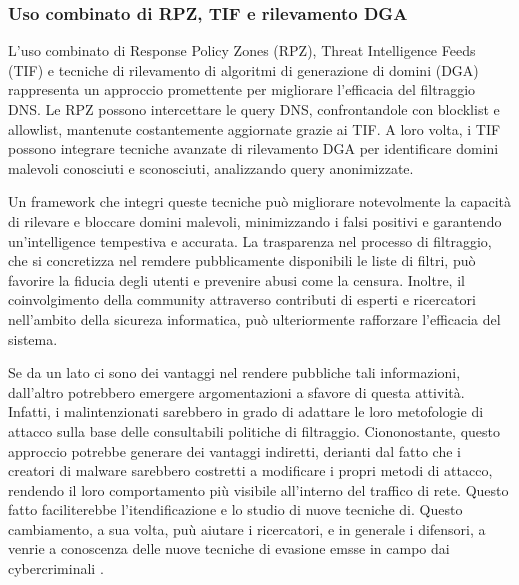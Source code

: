 \subsubsection{Uso combinato di RPZ, TIF e rilevamento DGA}
L'uso combinato di Response Policy Zones (RPZ), Threat Intelligence Feeds (TIF) e tecniche di rilevamento di algoritmi di generazione di domini (DGA) rappresenta un approccio promettente per migliorare l'efficacia del filtraggio DNS. Le RPZ possono intercettare le query DNS, confrontandole con blocklist e allowlist, mantenute costantemente aggiornate grazie ai TIF. A loro volta, i TIF possono integrare tecniche avanzate di rilevamento DGA per identificare domini malevoli conosciuti e sconosciuti, analizzando query anonimizzate.

Un framework che integri queste tecniche può migliorare notevolmente la capacità di rilevare e bloccare domini malevoli, minimizzando i falsi positivi e garantendo un'intelligence tempestiva e accurata. La trasparenza nel processo di filtraggio, che si concretizza nel remdere pubblicamente disponibili le liste di filtri, può favorire la fiducia degli utenti e prevenire abusi come la censura. Inoltre, il coinvolgimento della community attraverso contributi di esperti e ricercatori nell'ambito della sicureza informatica, può ulteriormente rafforzare l'efficacia del sistema.

Se da un lato ci sono dei vantaggi nel rendere pubbliche tali informazioni, dall'altro potrebbero emergere argomentazioni a sfavore di questa attività. Infatti, i malintenzionati sarebbero in grado di adattare le loro metofologie di attacco sulla base delle consultabili politiche di filtraggio. Ciononostante, questo approccio potrebbe generare dei vantaggi indiretti, derianti dal fatto che i creatori di malware sarebbero costretti a modificare i propri metodi di attacco, rendendo il loro comportamento più visibile all'interno del traffico di rete. Questo fatto faciliterebbe l'itendificazione e lo studio di nuove tecniche di. Questo cambiamento, a sua volta, puù aiutare i ricercatori, e in generale i difensori, a venrie a conoscenza delle nuove tecniche di evasione emsse in campo dai cybercriminali \cite{Magnusson2024}.
